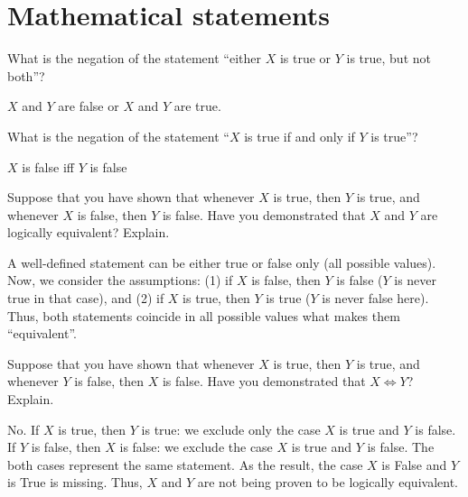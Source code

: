 \section{Mathematical statements}
\begin{exercise}
    What is the negation of the statement ``either $X$ is true or $Y$ is true, but not both''?
\end{exercise}
\begin{solution}
$X$ and $Y$ are false or $X$ and $Y$ are true. 
\end{solution}

\begin{exercise}
    What is the negation of the statement ``$X$ is true if and only if $Y$ is true''?
\end{exercise}
\begin{solution}
    $X$ is false iff $Y$ is false
\end{solution}

\begin{exercise}
    Suppose that you have shown that whenever $X$ is true, then $Y$ is true, and whenever $X$ is false, then $Y$ is false. Have you demonstrated that $X$ and $Y$ are logically equivalent? Explain.
\end{exercise}
\begin{solution}
    A well-defined statement can be either true or false only (all possible values). Now, we consider the assumptions: (1) if $X$ is false, then $Y$ is false ($Y$ is never true in that case), and (2) if $X$ is true, then $Y$ is true ($Y$ is never false here). Thus, both statements coincide in all possible values what makes them ``equivalent''.
\end{solution}

\begin{exercise}
    Suppose that you have shown that whenever $X$ is true, then $Y$ is true, and whenever $Y$ is false, then $X$ is false. Have you demonstrated that $X \Leftrightarrow Y$? Explain.
\end{exercise}
\begin{solution}
    No. If $X$ is true, then $Y$ is true: we exclude only the case $X$ is true and $Y$ is false. If $Y$ is false, then $X$ is false: we exclude the case $X$ is true and $Y$ is false. The both cases represent the same statement. As the result, the case $X$ is False and $Y$ is True is missing. Thus, $X$ and $Y$ are not being proven to be logically equivalent.
\end{solution}

